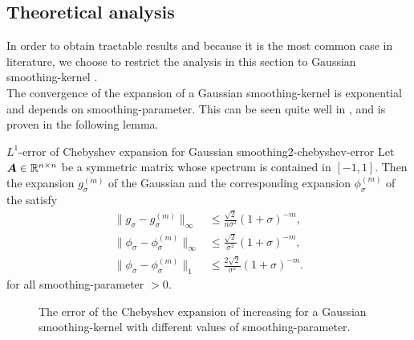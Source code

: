
\subsection{Theoretical analysis}
\label{subsec:2-chebyshev-theoretical-analysis}

In order to obtain tractable results and because it is the most common case in
literature, we choose to restrict the analysis in this section to Gaussian 
\gls{smoothing-kernel} .\\

The convergence of the expansion of a Gaussian \gls{smoothing-kernel} is exponential
and depends on \gls{smoothing-parameter}. This can be seen quite well
in , and is proven in the following
lemma.

\begin{lemma}{$L^1$-error of Chebyshev expansion for Gaussian smoothing}{2-chebyshev-error}
    Let $\boldsymbol{A} \in \mathbb{R}^{n \times n}$ be a symmetric matrix whose spectrum
    is contained in $[-1, 1]$. Then the expansion $g_{\sigma}^{(m)}$ of the Gaussian 
    and the corresponding expansion $\phi_{\sigma}^{(m)}$ of the  satisfy
    \begin{align}
        \lVert  g_{\sigma} - g_{\sigma}^{(m)} \rVert _{\infty} &\leq \frac{\sqrt{2}}{n \sigma^2} (1 + \sigma)^{-m},
        \label{equ:2-chebyshev-interpolation-sup-error-kernel} \\
        \lVert  \phi_{\sigma} - \phi_{\sigma}^{(m)} \rVert _{\infty} &\leq \frac{\sqrt{2}}{\sigma^2} (1 + \sigma)^{-m},
        \label{equ:2-chebyshev-interpolation-sup-error} \\
        \lVert  \phi_{\sigma} - \phi_{\sigma}^{(m)} \rVert _1 &\leq \frac{2\sqrt{2}}{\sigma^2} (1 + \sigma)^{-m}.
        \label{equ:2-chebyshev-interpolation-error}
    \end{align}
    for all \gls{smoothing-parameter} $>0$.
\end{lemma}

\begin{figure}[ht]
    \centering
    
    \caption{The error of the Chebyshev expansion of increasing 
    for a Gaussian \gls{smoothing-kernel} with different values of \gls{smoothing-parameter}.}
    \label{fig:2-chebyshev-chebyshev-convergence}
\end{figure}

